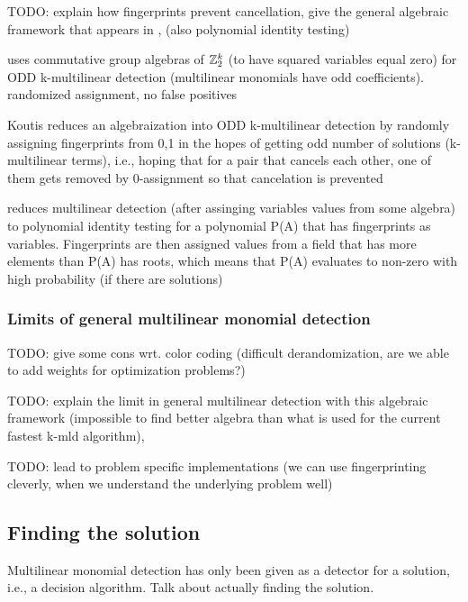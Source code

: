 TODO: explain how fingerprints prevent cancellation, 
give the general algebraic framework that appears in \cite{Williams09}, 
(also polynomial identity testing)

\cite{Koutis08} uses commutative group algebras of $\mathbb Z^{k}_{2}$ (to have squared variables equal zero) 
for ODD k-multilinear detection (multilinear monomials have odd coefficients). randomized assignment, no false positives

Koutis reduces an algebraization into ODD k-multilinear detection by randomly assigning fingerprints from {0,1} in the hopes 
of getting odd number of solutions (k-multilinear terms), 
i.e., hoping that for a pair that cancels each other, one of them gets removed by 0-assignment so that cancelation is prevented

\cite{Williams09} reduces multilinear detection (after assinging variables values from some algebra) 
to polynomial identity testing for a polynomial P(A) that has fingerprints as variables. 
Fingerprints are then assigned values from a field that has more elements than P(A) has roots, which 
means that P(A) evaluates to non-zero with high probability (if there are solutions)

\subsubsection{Limits of general multilinear monomial detection}
\label{sect:limits}

TODO: give some cons wrt. color coding (difficult derandomization, 
are we able to add weights for optimization problems?) %

TODO: explain the limit in general multilinear detection with this algebraic framework 
(impossible to find better algebra than what is used for the current fastest k-mld algorithm), \cite{KouWil09}

TODO: lead to problem specific implementations 
(we can use fingerprinting cleverly, when we understand the underlying problem well)

\subsection{Finding the solution}

Multilinear monomial detection has only been given as a detector for a solution, i.e., a decision algorithm. 
Talk about actually finding the solution.

